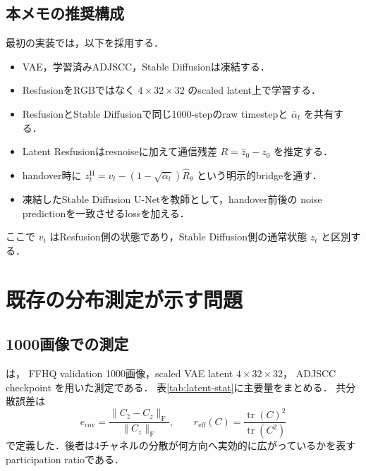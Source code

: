 \documentclass[11pt,a4paper]{ltjsarticle}
\newcommand{\tr}{\operatorname{tr}}
\begin{document}
\subsection{本メモの推奨構成}

最初の実装では，以下を採用する．
\begin{itemize}
  \item VAE，学習済みADJSCC，Stable Diffusionは凍結する．
  \item ResfusionをRGBではなく \(4\times32\times32\) のscaled latent上で学習する．
  \item ResfusionとStable Diffusionで同じ1000-stepのraw timestepと
        \(\bar\alpha_t\) を共有する．
  \item Latent Resfusionはresnoiseに加えて通信残差
        \(R=\hat z_0-z_0\) を推定する．
  \item handover時に
        \(z^{\mathrm H}_{t}=v_t-(1-\sqrt{\bar\alpha_t})\hat R_\theta\)
        という明示的bridgeを通す．
  \item 凍結したStable Diffusion U-Netを教師として，handover前後の
        noise predictionを一致させるlossを加える．
\end{itemize}
ここで \(v_t\) はResfusion側の状態であり，Stable Diffusion側の通常状態
\(z_t\) と区別する．

\section{既存の分布測定が示す問題}

\subsection{1000画像での測定}

 は，
FFHQ validation 1000画像，scaled VAE latent \(4\times32\times32\)，
ADJSCC checkpoint  を用いた測定である．
表\ref{tab:latent-stat}に主要量をまとめる．
共分散誤差は
\[
  e_{\mathrm{cov}}
  =
  \frac{\lVert C_{\hat z}-C_z\rVert_{\mathrm F}}
       {\lVert C_z\rVert_{\mathrm F}},
  \qquad
  r_{\mathrm{eff}}(C)
  =
  \frac{\tr(C)^2}{\tr(C^2)}
\]
で定義した．後者は4チャネルの分散が何方向へ実効的に広がっているかを表す
participation ratioである．
\end{document}
